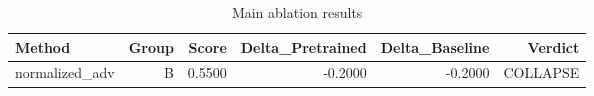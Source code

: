 \begin{table}[htbp]
\centering
\caption{Main ablation results}
\label{tab:main-results}
\begin{tabular}{lrrrrr}
\toprule
\textbf{Method} & \textbf{Group} & \textbf{Score} & \textbf{Delta\_Pretrained} & \textbf{Delta\_Baseline} & \textbf{Verdict} \\
\midrule
normalized\_adv & B & 0.5500 & -0.2000 & -0.2000 & COLLAPSE \\
\bottomrule
\end{tabular}
\end{table}